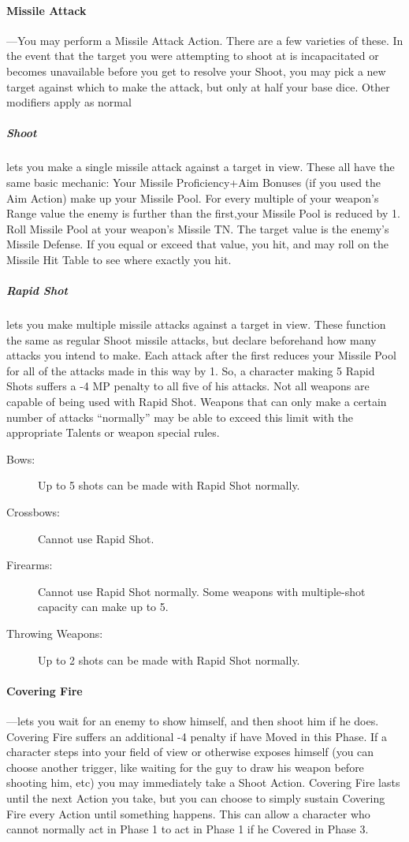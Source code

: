 \documentclass[oneside,11pt,english]{book}
\begin{document}
\paragraph{Missile Attack}---\quad You may perform a Missile Attack Action. There are a few varieties of these. In the event
that the target you were attempting to shoot at is incapacitated or becomes unavailable before you get to
resolve your Shoot, you may pick a new target against which to make the attack, but only at half your
base dice. Other modifiers apply as normal
\subparagraph{Shoot} lets you make a single missile attack against a target in view. These all have the same basic mechanic: Your Missile Proficiency+Aim Bonuses (if you used the Aim Action) make up your Missile Pool. For every multiple of your weapon’s Range value the enemy is further than the first,your Missile Pool is reduced by 1.
Roll Missile Pool at your weapon’s Missile TN. The target value is the enemy’s Missile Defense.
If you equal or exceed that value, you hit, and may roll on the Missile Hit Table to see where
exactly you hit.
\subparagraph{Rapid Shot} lets you make multiple missile attacks against a target in view. These function the
same as regular Shoot missile attacks, but declare beforehand how many attacks you intend to
make. Each attack after the first reduces your Missile Pool for all of the attacks made in this way by 1. So, a character making 5 Rapid Shots suffers a -4 MP penalty to all five of his attacks. Not
all weapons are capable of being used with Rapid Shot. Weapons that can only make a certain
number of attacks “normally” may be able to exceed this limit with the appropriate Talents or
weapon special rules.
\begin{description}
	\item [Bows:] Up to 5 shots can be made with Rapid Shot normally.
	\item	[Crossbows:] Cannot use Rapid Shot.
	\item	[Firearms:] Cannot use Rapid Shot normally. Some weapons with multiple-shot capacity can make up to 5.
	\item 	[Throwing Weapons:] Up to 2 shots can be made with Rapid Shot normally.
\end{description}

\paragraph{\label{par:Covering Fire} Covering Fire}---\quad lets you wait for an enemy to show himself, and then shoot him if he does.
Covering Fire suffers an additional -4 penalty if have Moved in this Phase. If a character steps
into your field of view or otherwise exposes himself (you can choose another trigger, like waiting
for the guy to draw his weapon before shooting him, etc) you may immediately take a Shoot
Action. Covering Fire lasts until the next Action you take, but you can choose to simply sustain
Covering Fire every Action until something happens. This can allow a character who cannot
normally act in Phase 1 to act in Phase 1 if he Covered in Phase 3.
\end{document}
